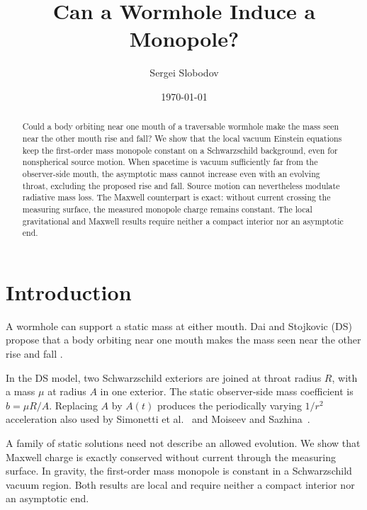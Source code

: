 \documentclass[aps,prd,10pt,onecolumn,nofootinbib,superscriptaddress,floatfix]{revtex4-2}
\begin{document}
\raggedbottom

\title{Can a Wormhole Induce a Monopole?}

\author{Sergei Slobodov}
\noaffiliation

\date{\today}

\begin{abstract}
Could a body orbiting near one mouth of a traversable wormhole make the mass
seen near the other mouth rise and fall?  We show that the local vacuum
Einstein equations keep the first-order mass monopole constant on a
Schwarzschild background, even for nonspherical source motion.
When spacetime is vacuum sufficiently far from the observer-side mouth,
the asymptotic mass cannot increase even with an evolving throat,
excluding the proposed rise and fall.
Source motion can nevertheless modulate radiative mass loss.
The Maxwell counterpart is exact: without current crossing the measuring
surface, the measured monopole charge remains constant.
The local gravitational and Maxwell results require neither a compact
interior nor an asymptotic end.
\end{abstract}

\maketitle

\section{Introduction}
\label{sec:introduction}

A wormhole can support a static mass at either mouth.  Dai and Stojkovic
(DS) propose that a body orbiting near one mouth makes the mass seen near
the other rise and fall \cite{DaiStojkovic2019Observing}.

In the DS model, two Schwarzschild exteriors are joined at throat radius
$R$, with a mass $\mu$ at radius $A$ in one exterior.  The static
observer-side mass coefficient is $b=\mu R/A$.  Replacing $A$ by $A(t)$
produces the periodically varying $1/r^2$ acceleration also used by
Simonetti et al.~\cite{SimonettiEtAl2021SensitiveSearches} and
Moiseev and Sazhina~\cite{MoiseevSazhina2025ObservationalSearch}.

A family of static solutions need not describe an allowed evolution.
We show that Maxwell charge is exactly conserved without current through
the measuring surface.  In gravity, the first-order mass monopole is
constant in a Schwarzschild vacuum region.  Both results are local and
require neither a compact interior
nor an asymptotic end.
\end{document}
